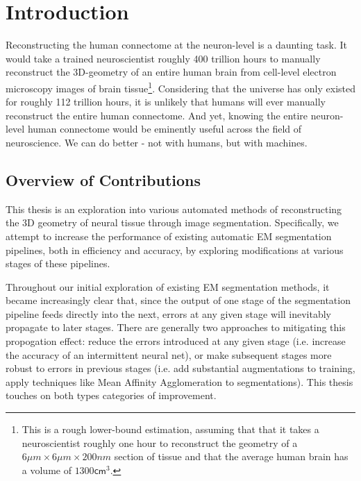 \chapter{Introduction}

Reconstructing the human connectome at the neuron-level is a daunting task. It would take a trained neuroscientist roughly 400 trillion hours to manually reconstruct the 3D-geometry of an entire human brain from cell-level electron microscopy images of brain tissue\footnote{This is a rough lower-bound estimation, assuming that that it takes a neuroscientist roughly one hour to reconstruct the geometry of a $6\mu m \times 6\mu m \times 200nm $ section of tissue and that the average human brain has a volume of $1300\mathsf{cm}^{3}$.}. Considering that the universe has only existed for roughly 112 trillion hours, it is unlikely that humans will ever manually reconstruct the entire human connectome. And yet, knowing the entire neuron-level human connectome would be eminently useful across the field of neuroscience. We can do better - not with humans, but with machines.


\section{Overview of Contributions}

This thesis is an exploration into various automated methods of reconstructing the 3D geometry of neural tissue through image segmentation. Specifically, we attempt to increase the performance of existing automatic EM segmentation pipelines, both in efficiency and accuracy, by exploring modifications at various stages of these pipelines. 

Throughout our initial exploration of existing EM segmentation methods, it became increasingly clear that, since the output of one stage of the segmentation pipeline feeds directly into the next, errors at any given stage will inevitably propagate to later stages. There are generally two approaches to mitigating this propogation effect: reduce the errors introduced at any given stage (i.e. increase the accuracy of an intermittent neural net), or make subsequent stages more robust to errors in previous stages (i.e. add substantial augmentations to training, apply techniques like Mean Affinity Agglomeration to segmentations). This thesis touches on both types categories of improvement.


